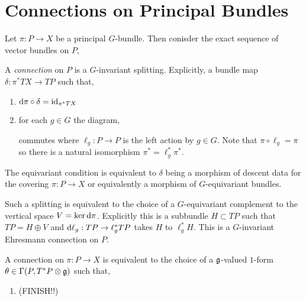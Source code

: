\documentclass[12pt]{extarticle}
\begin{document}
\section{Connections on Principal Bundles}

\begin{defn}
Let $\pi : P \to X$ be a principal $G$-bundle. Then conisder the exact sequence of vector bundles on $P$,
\begin{center}
\end{center}
A \textit{connection} on $P$ is a $G$-invariant splitting. Explicitly, a bundle map $\delta : \pi^* TX \to TP$ such that,
\begin{enumerate}
\item $\mathrm{d}{\pi} \circ \delta = \mathrm{id}_{\pi^* TX}$
\item for each $g \in G$ the diagram,
\begin{center}
\end{center} 
commutes where $\ell_g : P \to P$ is the left action by $g \in G$. Note that $\pi \circ \ell_g = \pi$ so there is a natural isomorphism $\pi^* = \ell_g^* \pi^*$.
\end{enumerate}
\end{defn}

\begin{rmk}
The equivariant condition is equivalent to $\delta$ being a morphism of descent data for the covering $\pi : P \to X$ or equivalently a morphism of $G$-equivariant bundles.
\end{rmk}

\begin{rmk}
Such a splitting is equivalent to the choice of a $G$-equivariant complement to the vertical space $V = \ker{\mathrm{d}{\pi}}$. Explicitly this is a subbundle $H \subset TP$ such that $TP = H \oplus V$ and $\mathrm{d}{\ell_g} : TP \to \ell_g^* TP$ takes $H$ to $\ell_g^* H$. This is a $G$-invariant Ehresmann connection on $P$.
\end{rmk}

\begin{lemma}
A connection on $\pi : P \to X$ is equivalent to the choice of a $\mathfrak{g}$-valued $1$-form $\theta \in \Gamma(P, T^*P \otimes \mathfrak{g})$ such that,
\begin{enumerate}
\item (FINISH!!)
\end{enumerate}
\end{lemma}
\end{document}
